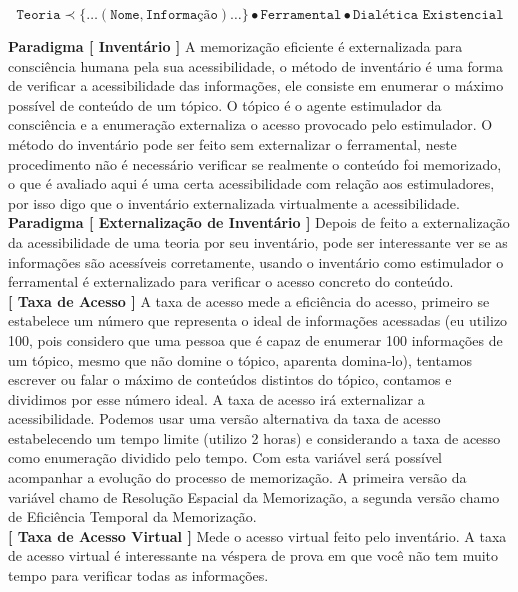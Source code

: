 $$ \texttt{Teoria} \prec \{ \dots ( \texttt{Nome} , \texttt{Informação} ) \dots \} \bullet \texttt{Ferramental} \bullet \texttt{Dialética Existencial} $$

\hspace{\baselineskip}

\textbf{Paradigma [ Inventário ]} A memorização eficiente é externalizada para consciência humana pela sua acessibilidade, o método de inventário é uma forma de verificar a acessibilidade das informações, ele consiste em enumerar o máximo possível de conteúdo de um tópico. O tópico é o agente estimulador da consciência e a enumeração externaliza o acesso provocado pelo estimulador. O método do inventário pode ser feito sem externalizar o ferramental, neste procedimento não é necessário verificar se realmente o conteúdo foi memorizado, o que é avaliado aqui é uma certa acessibilidade com relação aos estimuladores, por isso digo que o inventário externalizada virtualmente a acessibilidade. \\

\textbf{Paradigma [ Externalização de Inventário ]} Depois de feito a externalização da acessibilidade de uma teoria por seu inventário, pode ser interessante ver se as informações são acessíveis corretamente, usando o inventário como estimulador o ferramental é externalizado para verificar o acesso concreto do conteúdo.\\

\textbf{[ Taxa de Acesso ]} A taxa de acesso mede a eficiência do acesso, primeiro se estabelece um número que representa o ideal de informações acessadas (eu utilizo 100, pois considero que uma pessoa que é capaz de enumerar 100 informações de um tópico, mesmo que não domine o tópico, aparenta domina-lo), tentamos escrever ou falar o máximo de conteúdos distintos do tópico, contamos e dividimos por esse número ideal. A taxa de acesso irá externalizar a acessibilidade. Podemos usar uma versão alternativa da taxa de acesso estabelecendo um tempo limite (utilizo 2 horas) e considerando a taxa de acesso como enumeração dividido pelo tempo. Com esta variável será possível acompanhar a evolução do processo de memorização. A primeira versão da variável chamo de Resolução Espacial da Memorização, a segunda versão chamo de Eficiência Temporal da Memorização. \\

\textbf{[ Taxa de Acesso Virtual ]} Mede o acesso virtual feito pelo inventário. A taxa de acesso virtual é interessante na véspera de prova em que você não tem muito tempo para verificar todas as informações. \\


